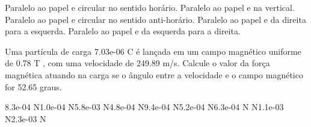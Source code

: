 \documentclass[12pt, addpoints]{exam}
\begin{document}
\begin{questions}
\begin{multicols*}{2}
\begin{choices}
\choice Paralelo ao papel e circular no sentido horário. 
\choice Paralelo ao papel e na vertical. 
\choice Paralelo ao papel e circular no sentido anti-horário. 
\choice Paralelo ao papel e da direita para a esquerda. 
\choice Paralelo ao papel e da esquerda para a direita. 
\end{choices}
\question Uma partícula de carga 7.03e-06 C é lançada em um campo magnético uniforme de    0.78 T , com uma velocidade de 249.89 m/s. Calcule o valor da força magnética atuando na carga se o ângulo entre a velocidade e o campo magnético for   52.65 graus.

\begin{oneparchoices}
\choice 8.3e-04 N\choice 1.0e-04 N\choice 5.8e-03 N\choice 4.8e-04 N\choice 9.4e-04 N\choice 5.2e-04 N\choice 6.3e-04 N N\choice 1.1e-03 N\choice 2.3e-03 N
\end{oneparchoices}\end{multicols*}
\end{questions}
\newpage
\end{document}
